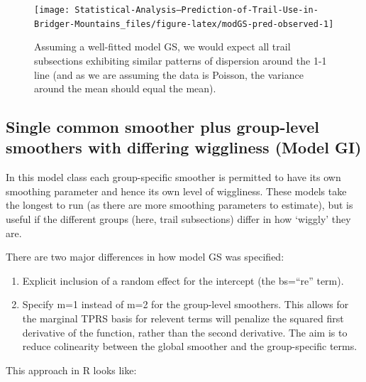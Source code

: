 \documentclass[
]{book}
\begin{document}
\begin{figure}

{\centering \texttt{[image: Statistical-Analysis--Prediction-of-Trail-Use-in-Bridger-Mountains\_files/figure-latex/modGS-pred-observed-1]} 

}

\caption{Assuming a well-fitted model GS, we would expect all trail subsections exhibiting similar patterns of dispersion around the 1-1 line (and as we are assuming the data is Poisson, the variance around the mean should equal the mean).}\label{fig:modGS-pred-observed}
\end{figure}

\hypertarget{single-common-smoother-plus-group-level-smoothers-with-differing-wiggliness-model-gi}{%
\subsection{Single common smoother plus group-level smoothers with differing wiggliness (Model GI)}\label{single-common-smoother-plus-group-level-smoothers-with-differing-wiggliness-model-gi}}

In this model class each group-specific smoother is permitted to have its own smoothing parameter and hence its own level of wiggliness. These models take the longest to run (as there are more smoothing parameters to estimate), but is useful if the different groups (here, trail subsections) differ in how `wiggly' they are.

There are two major differences in how model GS was specified:

\begin{enumerate}
\def\labelenumi{\arabic{enumi}.}
\item
  Explicit inclusion of a random effect for the intercept (the bs=``re'' term).
\item
  Specify m=1 instead of m=2 for the group-level smoothers. This allows for the marginal TPRS basis for relevent terms will penalize the squared first derivative of the function, rather than the second derivative. The aim is to reduce colinearity between the global smoother and the group-specific terms.
\end{enumerate}

This approach in R looks like:
\end{document}
